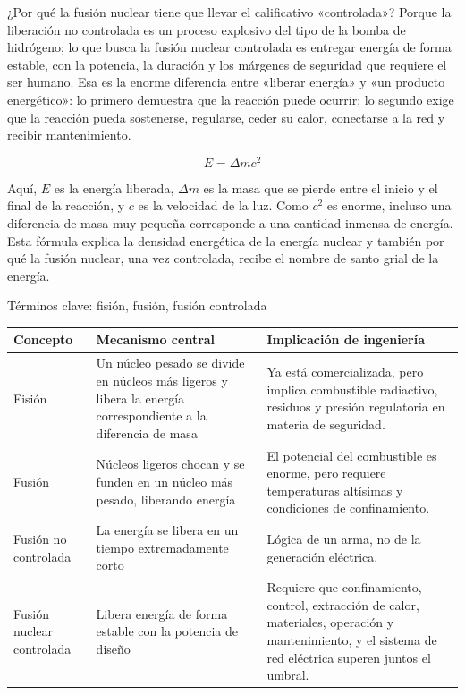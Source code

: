 \documentclass[a4paper]{article}
\begin{document}
¿Por qué la fusión nuclear tiene que llevar el calificativo «controlada»? Porque la liberación no controlada es un proceso explosivo del tipo de la bomba de hidrógeno; lo que busca la fusión nuclear controlada es entregar energía de forma estable, con la potencia, la duración y los márgenes de seguridad que requiere el ser humano. Esa es la enorme diferencia entre «liberar energía» y «un producto energético»: lo primero demuestra que la reacción puede ocurrir; lo segundo exige que la reacción pueda sostenerse, regularse, ceder su calor, conectarse a la red y recibir mantenimiento.

\[
E=\Delta m c^2
\]

Aquí, $E$ es la energía liberada, $\Delta m$ es la masa que se pierde entre el inicio y el final de la reacción, y $c$ es la velocidad de la luz. Como $c^2$ es enorme, incluso una diferencia de masa muy pequeña corresponde a una cantidad inmensa de energía. Esta fórmula explica la densidad energética de la energía nuclear y también por qué la fusión nuclear, una vez controlada, recibe el nombre de santo grial de la energía.

\begin{knowledgebox}{Términos clave: fisión, fusión, fusión controlada}
\begin{tabularx}{\textwidth}{p{}p{}X}
\toprule
Concepto & Mecanismo central & Implicación de ingeniería \\
\midrule
Fisión & Un núcleo pesado se divide en núcleos más ligeros y libera la energía correspondiente a la diferencia de masa & Ya está comercializada, pero implica combustible radiactivo, residuos y presión regulatoria en materia de seguridad. \\
Fusión & Núcleos ligeros chocan y se funden en un núcleo más pesado, liberando energía & El potencial del combustible es enorme, pero requiere temperaturas altísimas y condiciones de confinamiento. \\
Fusión no controlada & La energía se libera en un tiempo extremadamente corto & Lógica de un arma, no de la generación eléctrica. \\
Fusión nuclear controlada & Libera energía de forma estable con la potencia de diseño & Requiere que confinamiento, control, extracción de calor, materiales, operación y mantenimiento, y el sistema de red eléctrica superen juntos el umbral. \\
\bottomrule
\end{tabularx}
\end{knowledgebox}
\end{document}
